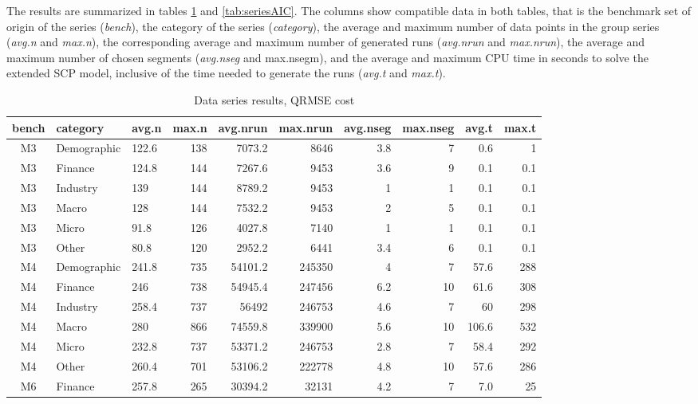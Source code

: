 \documentclass[preprints,article,submit,pdftex,moreauthors]{Definitions/mdpi}
\begin{document}
The results are summarized in tables \ref{tab:seriesQRMSE} and \ref{tab:seriesAIC}. The columns show compatible data in both tables, that is the benchmark set of origin of the series ({\it bench}), the category of the series ({\it category}), the average and maximum number of data points in the group series ({\it avg.n} and {\it max.n}), the corresponding average and maximum number of generated runs ({\it avg.nrun} and {\it max.nrun}), the average and maximum number of chosen segments ({\it avg.nseg} and {max.nsegm}), and the average and maximum CPU time in seconds to solve the extended SCP model, inclusive of the time needed to generate the runs ({\it avg.t} and {\it max.t}).

\begin{table}[H]
\centering
\caption{Data series results, QRMSE cost}\label{tab:seriesQRMSE}%
\begin{tabular}{@{}cl|lr|rr|rr|rr}
\toprule
bench & category & avg.n & max.n & avg.nrun & max.nrun & avg.nseg & max.nseg & avg.t & max.t \\
\midrule
		M3 & Demographic & 122.6 & 138 &  7073.2 &   8646 & 3.8 &  7 &  0.6 & 1 \\
		M3 & Finance     & 124.8 & 144 &  7267.6 &   9453 & 3.6 &  9 &  0.1 & 0.1 \\
		M3 & Industry    & 139   & 144 &  8789.2 &   9453 & 1   &  1 &  0.1 & 0.1 \\
		M3 & Macro       & 128   & 144 &  7532.2 &   9453 & 2   &  5 &  0.1 & 0.1 \\
		M3 & Micro       & 91.8  & 126 &  4027.8 &   7140 & 1   &  1 &  0.1 & 0.1 \\
		M3 & Other       & 80.8  & 120 &  2952.2 &   6441 & 3.4 &  6 &  0.1 & 0.1 \\
		M4 & Demographic & 241.8 & 735 & 54101.2 & 245350 & 4   &  7 & 57.6 & 288 \\
		M4 & Finance     & 246   & 738 & 54945.4 & 247456 & 6.2 & 10 & 61.6 & 308 \\
		M4 & Industry    & 258.4 & 737 & 56492   & 246753 & 4.6 &  7 & 60   & 298 \\
		M4 & Macro   	 & 280   & 866 & 74559.8 & 339900 & 5.6 & 10 &106.6 & 532 \\
		M4 & Micro   	 & 232.8 & 737 & 53371.2 & 246753 & 2.8 &  7 & 58.4 & 292 \\
		M4 & Other   	 & 260.4 & 701 & 53106.2 & 222778 & 4.8 & 10 & 57.6 & 286 \\
		M6 & Finance 	 & 257.8 & 265 & 30394.2 &  32131 & 4.2 &  7 &  7.0 & 25 \\
\bottomrule
\end{tabular}
\end{table}
\end{document}
